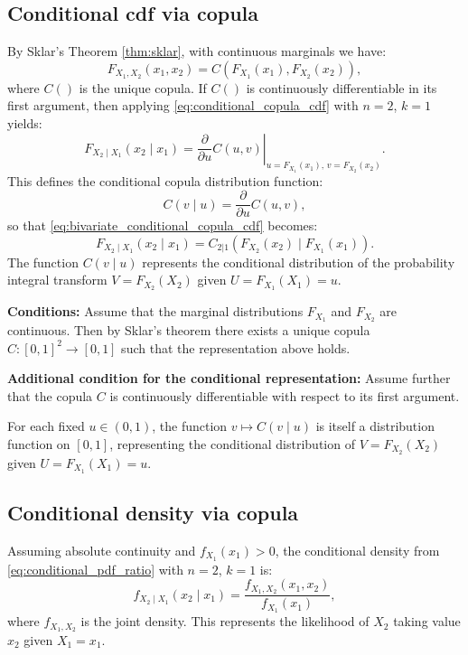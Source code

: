 \subsection{Conditional cdf via copula}\label{subsec:bivariate_copula_cdf}
By Sklar's Theorem \ref{thm:sklar}, with continuous marginals we have:
\begin{equation}\label{eq:bivariate_sklar}
F_{X_1,X_2}(x_1,x_2) = C(F_{X_1}(x_1), F_{X_2}(x_2)),
\end{equation}
where $C()$ is the unique copula. If $C()$ is continuously differentiable in its first argument, then applying \eqref{eq:conditional_copula_cdf} with $n=2$, $k=1$ yields:
\begin{equation}\label{eq:bivariate_conditional_copula_cdf}
F_{X_2\mid X_1}(x_2\mid x_1) = \left.\frac{\partial}{\partial u} C(u,v)\right|_{u=F_{X_1}(x_1),\,v=F_{X_2}(x_2)}.
\end{equation}
This defines the conditional copula distribution function:
\begin{equation}\label{eq:bivariate_conditional_copula}
C(v\mid u) = \frac{\partial}{\partial u} C(u,v),
\end{equation}
so that \eqref{eq:bivariate_conditional_copula_cdf} becomes:
\begin{equation}\label{eq:bivariate_conditional_copula_form}
\boxed{F_{X_2\mid X_1}(x_2\mid x_1) = C_{2|1}\!\left(F_{X_2}(x_2)\mid F_{X_1}(x_1)\right)}.
\end{equation}
The function $C(v\mid u)$ represents the conditional distribution of the probability integral transform $V = F_{X_2}(X_2)$ given $U = F_{X_1}(X_1) = u$.

\textbf{Conditions:} Assume that the marginal distributions $F_{X_1}$ and $F_{X_2}$ are continuous. Then by Sklar's theorem there exists a unique copula $C:[0,1]^2\to[0,1]$ such that the representation above holds.

\textbf{Additional condition for the conditional representation:} Assume further that the copula $C$ is continuously differentiable with respect to its first argument.

\begin{remarkbox}
\begin{remarkT}
For each fixed $u\in(0,1)$, the function $v\mapsto C(v\mid u)$ is itself a distribution function on $[0,1]$, representing the conditional distribution of $V=F_{X_2}(X_2)$ given $U=F_{X_1}(X_1)=u$.
\end{remarkT}
\end{remarkbox}
\subsection{Conditional density via copula}\label{subsec:bivariate_conditional_density}
Assuming absolute continuity and $f_{X_1}(x_1)>0$, the conditional density from \eqref{eq:conditional_pdf_ratio} with $n=2$, $k=1$ is:
\begin{equation}\label{eq:bivariate_conditional_density}
f_{X_2\mid X_1}(x_2\mid x_1) = \frac{f_{X_1,X_2}(x_1,x_2)}{f_{X_1}(x_1)},
\end{equation}
where $f_{X_1,X_2}$ is the joint density. This represents the likelihood of $X_2$ taking value $x_2$ given $X_1 = x_1$.


